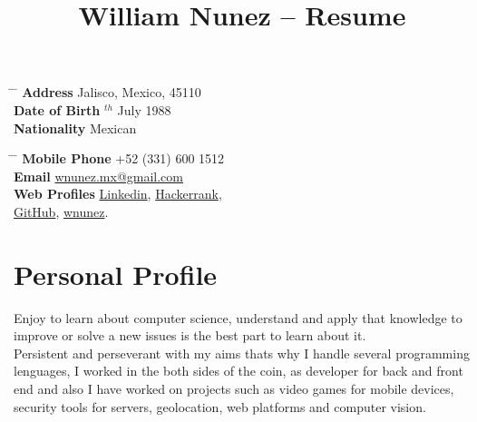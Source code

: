 \documentclass[10pt]{article} %
\begin{document}

\title{William Nunez -- Resume} %


\parbox{0.5\textwidth}{ %
\begin{tabbing} %
\hspace{3cm} \= \hspace{4cm} \= \kill %
{\bf Address} \> Jalisco, Mexico, 45110 \\ %
{\bf Date of Birth} $^{th}$ July 1988 \\ %
{\bf Nationality} \> Mexican %
\end{tabbing}}
\hfill %
\parbox{0.5\textwidth}{ %
\begin{tabbing} %
\hspace{3cm} \= \hspace{4cm} \= \kill %
{\bf Mobile Phone} \> +52 (331) 600 1512 \\ %
{\bf Email} \> \href{mailto:wnunez.mx@gmail.com}{wnunez.mx@gmail.com} \\ %
{\bf Web Profiles} \> \href{https://mx.linkedin.com/in/wllmnc}{Linkedin}, \href{https://www.hackerrank.com/wnunez}{Hackerrank}, \\
\> \href{//https://github.com/wllmnc}{GitHub}, \href{http://www.wnunez.com}{wnunez}.
\end{tabbing}}


\section{Personal Profile}

Enjoy to learn about computer science, understand and apply that knowledge to improve or solve a new issues is the best part to learn about it. \\
Persistent and perseverant with my aims thats why I handle several programming lenguages, I worked in the both sides of the coin, as developer for back and front end and also I have worked on projects such as video games for mobile devices, security tools for servers, geolocation, web platforms and computer vision.
\end{document}
